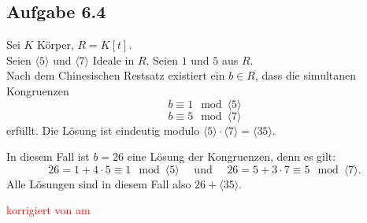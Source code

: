 \documentclass[12pt]{article}
\newcommand{\corr}[1]{\textcolor{red}{#1}}
\newcommand{\ideal}[1]{\langle#1\rangle}
\begin{document}
\subsection*{Aufgabe 6.4}
Sei $K$ Körper, $R=K[t]$. \\
Seien $\ideal{5}$ und $\ideal{7}$ Ideale in $R$. Seien $1$ und $5$ aus $R$. \\
Nach dem Chinesischen Restsatz existiert ein $b\in R$, dass die simultanen Kongruenzen
$$b\equiv 1\mod \ideal{5}$$
$$b\equiv 5\mod \ideal{7}$$
erfüllt. Die Lösung ist eindeutig modulo $\ideal{5}\cdot\ideal{7}=\ideal{35}$.

In diesem Fall ist $b=26$ eine Lösung der Kongruenzen, denn es gilt:
$$26=1+4\cdot5 \equiv 1\mod\ideal{5}\quad\text{ und }\quad 26=5+3\cdot 7\equiv 5\mod\ideal{7}.$$
Alle Lösungen sind in diesem Fall also $26+\ideal{35}$.

\bigskip

\corr{korrigiert von \hspace{1cm} am }
\end{document}
